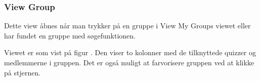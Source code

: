 \subsubsection{View Group}
Dette view åbnes når man trykker på en gruppe i View My Groups viewet eller har fundet en gruppe med søgefunktionen.

Viewet er som vist på figur . Den viser to kolonner med de tilknyttede quizzer og medlemmerne i gruppen. Det er også muligt at farvorisere gruppen ved at klikke på stjernen. 

